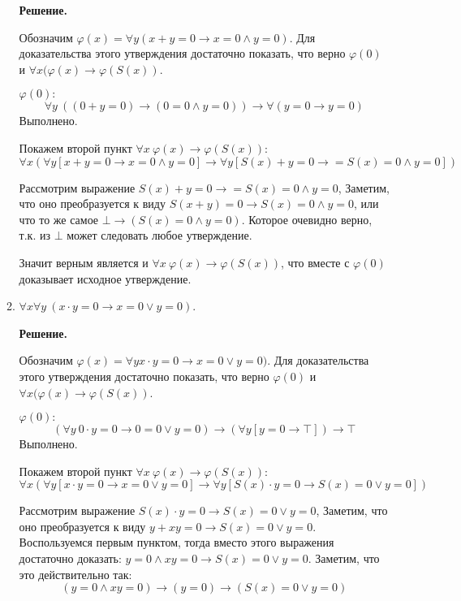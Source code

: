 \begin{enumerate}
\begin{enumerate}
\textbf{Решение.} 

Обозначим $\varphi(x) = \forall y (x + y = 0 \to x = 0 \land y = 0)$. Для доказательства этого утверждения 
достаточно показать, что верно $\varphi(0)$ и $\forall x (\varphi(x) \to \varphi(S(x))$.

$\varphi(0):$ 
\begin{equation*}
\forall y \ ((0 + y = 0) \to (0 = 0 \land y = 0)) \to \forall (y = 0 \to y = 0)
\end{equation*}
Выполнено.

Покажем второй пункт  $\forall x \ \varphi(x) \to \varphi(S(x))$:
\begin{equation*}
\forall x (\forall y [x + y = 0 \to x = 0 \land y = 0] \to \forall y [S(x) + y = 0 \to  = S(x) = 0 \land y = 0])
\end{equation*}

Рассмотрим выражение $S(x) + y = 0 \to  = S(x) = 0 \land y = 0$, Заметим, что оно преобразуется к виду $S(x + 
y) = 0 \to S(x) = 0 \land y = 0$, или что то же самое $\bot \to (S(x) = 0 \land y = 0)$. Которое очевидно 
верно, т.к. из $\bot$ может следовать любое утверждение. 

Значит верным является и $\forall x \ \varphi(x) \to \varphi(S(x))$, что вместе с $\varphi(0)$ доказывает 
исходное утверждение.

\item $\forall x \forall y\ (x \cdot y = 0 \to x = 0 \lor y = 0)$.

\textbf{Решение.} 

Обозначим $\varphi(x) = \forall y x \cdot y = 0 \to x = 0 \lor y = 0)$. Для доказательства этого утверждения 
достаточно показать, что верно $\varphi(0)$ и $\forall x (\varphi(x) \to \varphi(S(x))$.

$\varphi(0):$ 
\begin{equation*}
(\forall y \ 0 \cdot y = 0 \to 0 = 0 \lor y = 0) \to (\forall y [y = 0 \to \top]) \to \top 
\end{equation*}
Выполнено.

Покажем второй пункт  $\forall x \ \varphi(x) \to \varphi(S(x))$:
\begin{equation*}
\forall x (\forall y [x \cdot y = 0 \to x = 0 \lor y = 0] \to \forall y [S(x) \cdot y = 0 \to S(x) = 0 \lor y = 0])
\end{equation*}

Рассмотрим выражение $S(x) \cdot y = 0 \to S(x) = 0 \lor y = 0$, Заметим, что оно преобразуется к виду $y + xy = 0 \to S(x) = 0 \lor y = 0$. Воспользуемся первым пунктом, тогда вместо этого выражения достаточно доказать: $y = 0 \land xy = 0 \to S(x) = 0 \lor y = 0$. Заметим, что это действительно так: 
\begin{equation*}
(y = 0 \land xy = 0) \to (y = 0) \to (S(x) = 0 \lor y = 0)
\end{equation*}


\end{enumerate}
\end{enumerate}
